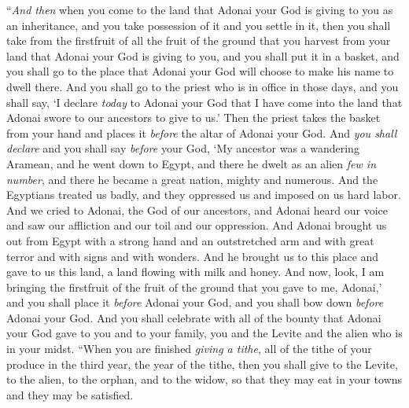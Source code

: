 \begin{biblechapter} %
\verse “\textit{And then} when you come to the land that Adonai your God is giving to you as an inheritance, and you take possession of it and you settle in it,
\verse then you shall take from the firstfruit of all the fruit of the ground that you harvest from your land that Adonai your God is giving to you, and you shall put it in a basket, and you shall go to the place that Adonai your God will choose to make his name to dwell there.
\verse And you shall go to the priest who is in office in those days, and you shall say, ‘I declare \textit{today} to Adonai your God that I have come into the land that Adonai swore to our ancestors to give to us.’
\verse Then the priest takes the basket from your hand and places it \textit{before} the altar of Adonai your God.
\verse And \textit{you shall declare} and you shall say \textit{before} your God, ‘My ancestor was a wandering Aramean, and he went down to Egypt, and there he dwelt as an alien \textit{few in number}, and there he became a great nation, mighty and numerous.
\verse And the Egyptians treated us badly, and they oppressed us and imposed on us hard labor.
\verse And we cried to Adonai, the God of our ancestors, and Adonai heard our voice and saw our affliction and our toil and our oppression.
\verse And Adonai brought us out from Egypt with a strong hand and an outstretched arm and with great terror and with signs and with wonders.
\verse And he brought us to this place and gave to us this land, a land flowing with milk and honey.
\verse And now, look, I am bringing the firstfruit of the fruit of the ground that you gave to me, Adonai,’ and you shall place it \textit{before} Adonai your God, and you shall bow down \textit{before} Adonai your God.
\verse And you shall celebrate with all of the bounty that Adonai your God gave to you and to your family, you and the Levite and the alien who is in your midst.
\verse “When you are finished \textit{giving a tithe}, all of the tithe of your produce in the third year, the year of the tithe, then you shall give to the Levite, to the alien, to the orphan, and to the widow, so that they may eat in your towns and they may be satisfied.

\end{biblechapter}

